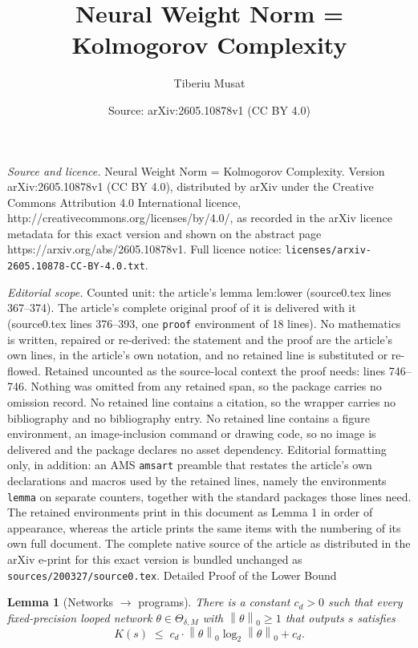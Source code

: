 \documentclass[10pt,a4paper]{amsart}
\title{Neural Weight Norm = Kolmogorov Complexity}
\author{Tiberiu Musat}
\date{Source: arXiv:2605.10878v1 (CC BY 4.0)}
\newtheorem{lemma}{Lemma}
\newcommand{\Param}{\Theta}
\newcommand{\norm}[1]{\left\lVert#1\right\rVert}
\providecommand{\section}{}
\begin{document}
\maketitle

\noindent\emph{Source and licence.} Neural Weight Norm = Kolmogorov Complexity. Version arXiv:2605.10878v1 (CC BY 4.0), distributed by arXiv under the Creative Commons Attribution 4.0 International licence, http://creativecommons.org/licenses/by/4.0/, as recorded in the arXiv licence metadata for this exact version and shown on the abstract page https://arxiv.org/abs/2605.10878v1. Full licence notice: \texttt{licenses/arxiv-2605.10878-CC-BY-4.0.txt}.\par\smallskip

\noindent\textit{Editorial scope.} Counted unit: the article's lemma lem:lower (source0.tex lines 367--374). The article's complete original proof of it is delivered with it (source0.tex lines 376--393, one \texttt{proof} environment of 18 lines). No mathematics is written, repaired or re-derived: the statement and the proof are the article's own lines, in the article's own notation, and no retained line is substituted or re-flowed.  Retained uncounted as the source-local context the proof needs: lines 746--746.  Nothing was omitted from any retained span, so the package carries no omission record.  No retained line contains a citation, so the wrapper carries no bibliography and no bibliography entry.  No retained line contains a figure environment, an image-inclusion command or drawing code, so no image is delivered and the package declares no asset dependency.  Editorial formatting only, in addition: an AMS \texttt{amsart} preamble that restates the article's own declarations and macros used by the retained lines, namely the environments \texttt{lemma} on separate counters, together with the standard packages those lines need.  The retained environments print in this document as Lemma 1 in order of appearance, whereas the article prints the same items with the numbering of its own full document.  The complete native source of the article as distributed in the arXiv e-print for this exact version is bundled unchanged as \texttt{sources/200327/source0.tex}.
\section{Detailed Proof of the Lower Bound}\label{app:lower}

\begin{lemma}[Networks $\to$ programs]\label{lem:lower}
  There is a constant $c_d > 0$ such that every fixed-precision looped network
  $\theta \in \Param_{\delta, M}$ with $\norm{\theta}_0 \ge 1$ that outputs
  $s$ satisfies
  \[
    K(s) \;\le\; c_d \cdot \norm{\theta}_0 \log_2 \norm{\theta}_0 + c_d.
  \]
\end{lemma}
\end{document}
